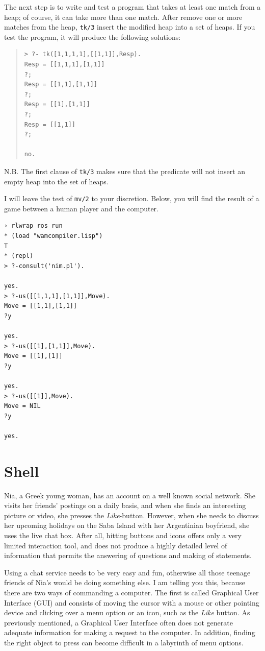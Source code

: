\documentclass[a4paper,12pt]{book}
\begin{document}
The next step is to write and test a program that takes
at least one match from a heap; of course, it can take
more than one match. After remove one or more matches
from the heap, \verb|tk/3| insert the modified heap into
a set of heaps. If you test the program, it will produce
the following solutions:
\begin{quote}
\begin{verbatim}
> ?- tk([1,1,1,1],[[1,1]],Resp).
Resp = [[1,1,1],[1,1]]
?;
Resp = [[1,1],[1,1]]
?;
Resp = [[1],[1,1]]
?;
Resp = [[1,1]]
?;

no.
\end{verbatim}
\end{quote}
N.B. The first clause of \verb|tk/3| makes sure that the
predicate will not insert an empty heap into the set of heaps.

I will leave the test of \verb|mv/2| to your discretion.
Below, you will find the result of a game between a human
player and the computer.

\begin{verbatim}
› rlwrap ros run
* (load "wamcompiler.lisp")
T
* (repl)
> ?-consult('nim.pl').

yes.
> ?-us([[1,1,1],[1,1]],Move).
Move = [[1,1],[1,1]]
?y

yes.
> ?-us([[1],[1,1]],Move).
Move = [[1],[1]]
?y

yes.
> ?-us([[1]],Move).
Move = NIL
?y

yes.
\end{verbatim}

\chapter{Shell}
Nia, a Greek young woman, has an
account on a well known social network.
She visits her friends' postings on a daily basis,
and when she finds an interesting picture or video,
she presses the {\em Like}-button. However, when
she needs to discuss her upcoming holidays on the Saba Island
with her Argentinian boyfriend, she uses the
live chat box. After all, hitting buttons and
icons offers only a very limited interaction tool,
and does not produce a highly detailed
level of information that permits the answering
of questions and making of statements.


Using a chat service needs to
be very easy and fun, otherwise all those teenage
friends of Nia's would be doing something else.
I am telling you this, because there are
two ways of commanding a computer.
The first is called Graphical User Interface (GUI)
and consists of moving the cursor with a
mouse or other pointing device and clicking
over a menu option or an icon,
such as the {\em Like} button.
As previously mentioned, a Graphical User Interface
often does not generate adequate information
for making a request to the computer. In addition,
finding the right object  to press
can become difficult in a labyrinth of
menu options.
\end{document}
